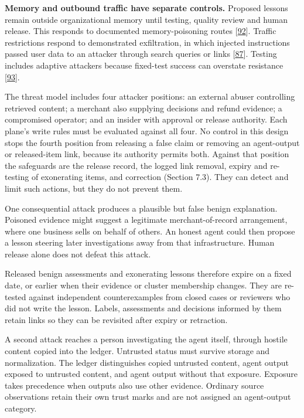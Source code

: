 \documentclass[
  11pt,
]{article}
\begin{document}
\textbf{Memory and outbound traffic have separate controls.} Proposed
lessons remain outside organizational memory until testing, quality
review and human release. This responds to documented memory-poisoning
routes {[}\protect\hyperlink{ref-Dash2026}{92}{]}. Traffic restrictions
respond to demonstrated exfiltration, in which injected instructions
passed user data to an attacker through search queries or links
{[}\protect\hyperlink{ref-Greshake2023}{87}{]}. Testing includes
adaptive attackers because fixed-test success can overstate resistance
{[}\protect\hyperlink{ref-Nasr2025}{93}{]}.

The threat model includes four attacker positions: an external abuser
controlling retrieved content; a merchant also supplying decisions and
refund evidence; a compromised operator; and an insider with approval or
release authority. Each plane's write rules must be evaluated against
all four. No control in this design stops the fourth position from
releasing a false claim or removing an agent-output or released-item
link, because its authority permits both. Against that position the
safeguards are the release record, the logged link removal, expiry and
re-testing of exonerating items, and correction (Section 7.3). They can
detect and limit such actions, but they do not prevent them.

One consequential attack produces a plausible but false benign
explanation. Poisoned evidence might suggest a legitimate
merchant-of-record arrangement, where one business sells on behalf of
others. An honest agent could then propose a lesson steering later
investigations away from that infrastructure. Human release alone does
not defeat this attack.

Released benign assessments and exonerating lessons therefore expire on
a fixed date, or earlier when their evidence or cluster membership
changes. They are re-tested against independent counterexamples from
closed cases or reviewers who did not write the lesson. Labels,
assessments and decisions informed by them retain links so they can be
revisited after expiry or retraction.

A second attack reaches a person investigating the agent itself, through
hostile content copied into the ledger. Untrusted status must survive
storage and normalization. The ledger distinguishes copied untrusted
content, agent output exposed to untrusted content, and agent output
without that exposure. Exposure takes precedence when outputs also use
other evidence. Ordinary source observations retain their own trust
marks and are not assigned an agent-output category.
\end{document}
